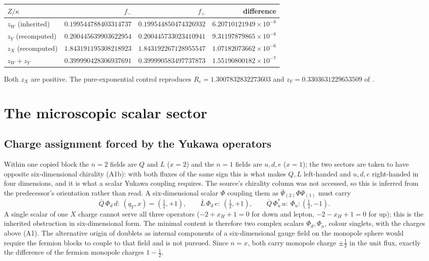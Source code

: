 \documentclass[11pt,letterpaper]{article}
\begin{document}
\begin{center}\small
\begin{tabular}{@{}lrrr@{}}
\toprule
$Z/\kappa$ & $f_-$ & $f_+$ & difference\\
\midrule
$z_W$ (inherited) & $0.199544788403314737$ & $0.199544850474326932$ & $6.20710121949\times10^{-8}$\\
$z_Y$ (recomputed) & $0.200445639903622954$ & $0.200445733023410941$ & $9.31197879865\times10^{-8}$\\
$z_X$ (recomputed) & $1.843191195308218923$ & $1.843192267128955547$ & $1.07182073662\times10^{-6}$\\
$z_W+z_Y$ & $0.399990428306937691$ & $0.399990583497737873$ & $1.55190800182\times10^{-7}$\\
\bottomrule
\end{tabular}
\end{center}
Both $z_X$ are positive. The pure-exponential control reproduces $R_e=1.3007832832273603$ and $z_Y=0.3303631229653509$ of \cite{oct21}.

\section{The microscopic scalar sector}

\subsection{Charge assignment forced by the Yukawa operators}

Within one copied block the $n=2$ fields are $Q$ and $L$ ($x=2$) and the $n=1$ fields are $u,d,e$ ($x=1$); the two sectors are taken to have opposite six-dimensional chirality (A1b): with both fluxes of the same sign this is what makes $Q,L$ left-handed and $u,d,e$ right-handed in four dimensions, and it is what a scalar Yukawa coupling requires. The source's chirality column was not accessed, so this is inferred from the predecessor's orientation rather than read. A six-dimensional scalar $\Phi$ coupling them as $\bar\Psi_{(2)}\Phi\Psi_{(1)}$ must carry
\begin{equation}
\bar Q\,\Phi_d\,d:\ (q_Y,x)=(\tfrac12,+1),\qquad \bar L\,\Phi_d\,e:\ (\tfrac12,+1),\qquad \bar Q\,\Phi_u^{*}\,u:\ \Phi_u:(\tfrac12,-1).
\end{equation}
A single scalar of one $X$ charge cannot serve all three operators ($-2+x_H+1=0$ for down and lepton, $-2-x_H+1=0$ for up); this is the inherited obstruction \cite{neutral} in six-dimensional form. The minimal content is therefore two complex scalars $\Phi_d,\Phi_u$, colour singlets, with the charges above (A1). The alternative origin of doublets as internal components of a six-dimensional gauge field on the monopole sphere \cite{Manton} would require the fermion blocks to couple to that field and is not pursued. Since $n=x$, both carry monopole charge $\pm\tfrac12$ in the unit flux, exactly the difference of the fermion monopole charges $1-\tfrac12$.
\end{document}
